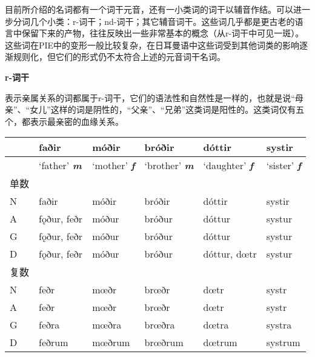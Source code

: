 目前所介绍的名词都有一个词干元音，还有一小类词的词干以辅音作结。可以进一步分词几个小类：r-词干；nd-词干；其它辅音词干。这些词几乎都是更古老的语言中保留下来的产物，往往反映出一些非常基本的概念（从r-词干中可见一斑）。这些词在PIE中的变形一般比较复杂，在日耳曼语中这些词受到其他词类的影响逐渐规则化，但它们的形式仍不太符合上述的元音词干名词。

\textbf{r-词干}

表示亲属关系的词都属于r-词干，它们的语法性和自然性是一样的，也就是说``母亲''、``女儿''这样的词是阴性的，``父亲''、``兄弟''这类词是阳性的。这类词仅有五个，都表示最亲密的血缘关系。

\begin{longtable}{llllll}
  \toprule
                    & faðir                        & móðir                      & bróðir    & dóttir       & systir  \\
  \midrule
  \endhead
  \bottomrule
  \endfoot
                    & `father' \emph{\textbf{m}}   & `mother' \emph{\textbf{f}} & `brother'
  \emph{\textbf{m}} & `daughter' \emph{\textbf{f}} & `sister'
  \emph{\textbf{f}}                                                                                                  \\
  单数              &                              &                            &           &              &         \\
  N                 & faðir                        & móðir                      & bróðir    & dóttir       & systir  \\
  A                 & fǫður, feðr                  & móður                      & bróður    & dóttur       & systur  \\
  G                 & fǫður, feðr                  & móður                      & bróður    & dóttur       & systur  \\
  D                 & fǫður, feðr                  & móður                      & bróður    & dóttur, dœtr & systur  \\
  复数              &                              &                            &           &              &         \\
  N                 & feðr                         & mœðr                       & brœðr     & dœtr         & systr   \\
  A                 & feðr                         & mœðr                       & brœðr     & dœtr         & systr   \\
  G                 & feðra                        & mœðra                      & brœðra    & dœtra        & systra  \\
  D                 & feðrum                       & mœðrum                     & brœðrum   & dœtrum       & systrum \\
\end{longtable}

